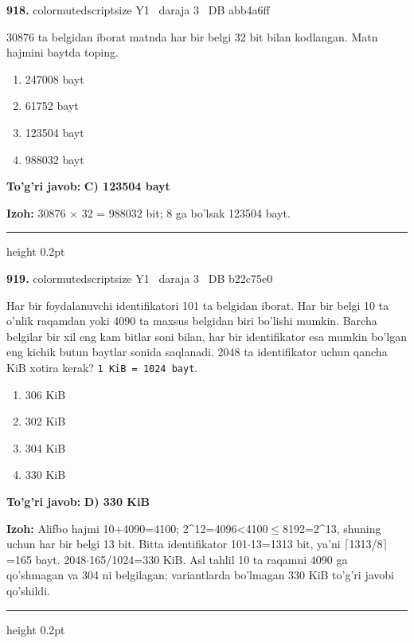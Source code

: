 \documentclass[10pt,a4paper,oneside]{article}
\begin{document}
\noindent\textbf{\color{ink}918.}  {color{muted}scriptsize Y1 \textbullet\ daraja 3 \textbullet\ DB abb4a6ff}
\par
30876 ta belgidan iborat matnda har bir belgi 32 bit bilan kodlangan. Matn hajmini baytda toping.
\begin{enumerate}[label=\Alph*),leftmargin=9mm]
\item 247008 bayt
\item 61752 bayt
\item 123504 bayt
\item 988032 bayt
\end{enumerate}
\begin{tcolorbox}[enhanced,breakable,colback=teal!4,colframe=teal!50!black,boxrule=0.5pt,arc=1.1mm,left=3mm,right=3mm,top=1.7mm,bottom=1.7mm,before skip=2mm,after skip=2mm]
\textbf{\color{teal}To'g'ri javob:} \textbf{C) 123504 bayt}
\par\smallskip
\textbf{Izoh:} 30876 \ensuremath{\times} 32 = 988032 bit; 8 ga bo'lsak 123504 bayt.
\end{tcolorbox}
\vspace{2mm}\hrule height 0.2pt \vspace{3mm}

\noindent\textbf{\color{ink}919.}  {color{muted}scriptsize Y1 \textbullet\ daraja 3 \textbullet\ DB b22c75e0}
\par
Har bir foydalanuvchi identifikatori 101 ta belgidan iborat. Har bir belgi 10 ta o'nlik raqamdan yoki 4090 ta maxsus belgidan biri bo'lishi mumkin. Barcha belgilar bir xil eng kam bitlar soni bilan, har bir identifikator esa mumkin bo'lgan eng kichik butun baytlar sonida saqlanadi. 2048 ta identifikator uchun qancha KiB xotira kerak? \texttt{1 KiB = 1024 bayt}.
\begin{enumerate}[label=\Alph*),leftmargin=9mm]
\item 306 KiB
\item 302 KiB
\item 304 KiB
\item 330 KiB
\end{enumerate}
\begin{tcolorbox}[enhanced,breakable,colback=teal!4,colframe=teal!50!black,boxrule=0.5pt,arc=1.1mm,left=3mm,right=3mm,top=1.7mm,bottom=1.7mm,before skip=2mm,after skip=2mm]
\textbf{\color{teal}To'g'ri javob:} \textbf{D) 330 KiB}
\par\smallskip
\textbf{Izoh:} Alifbo hajmi 10+4090=4100; 2\textasciicircum{}12=4096\textless{}4100\ensuremath{\leq}8192=2\textasciicircum{}13, shuning uchun har bir belgi 13 bit. Bitta identifikator 101\ensuremath{\cdot}13=1313 bit, ya'ni \ensuremath{\lceil}1313/8\ensuremath{\rceil}=165 bayt. 2048\ensuremath{\cdot}165/1024=330 KiB. Asl tahlil 10 ta raqamni 4090 ga qo'shmagan va 304 ni belgilagan; variantlarda bo'lmagan 330 KiB to'g'ri javobi qo'shildi.
\end{tcolorbox}
\vspace{2mm}\hrule height 0.2pt \vspace{3mm}
\end{document}
